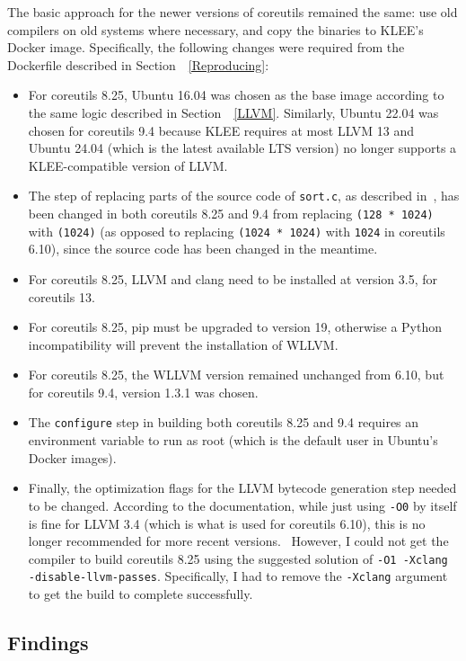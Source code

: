 \documentclass{article}
\let\savedCite=\cite
\renewcommand{\cite}{\unskip~\savedCite}
\let\savedRef=\ref
\renewcommand{\ref}{\unskip~\savedRef}
\begin{document}
The basic approach for the newer versions of coreutils remained the same: use old compilers on old systems where necessary, and copy the binaries to KLEE's Docker image. Specifically, the following changes were required from the Dockerfile described in Section~\ref{Reproducing}:
\begin{itemize}
    \item For coreutils 8.25, Ubuntu 16.04 was chosen as the base image according to the same logic described in Section~\ref{LLVM}. Similarly, Ubuntu 22.04 was chosen for coreutils 9.4 because KLEE requires at most LLVM 13 and Ubuntu 24.04 (which is the latest available LTS version) no longer supports a KLEE-compatible version of LLVM.
    \item The step of replacing parts of the source code of \lstinline{sort.c}, as described in\cite{KLEEFAQ}, has been changed in both coreutils 8.25 and 9.4 from replacing \lstinline{(128 * 1024)} with \lstinline{(1024)} (as opposed to replacing \lstinline{(1024 * 1024)} with \lstinline{1024} in coreutils 6.10), since the source code has been changed in the meantime.
    \item For coreutils 8.25, LLVM and clang need to be installed at version 3.5, for coreutils 13.
    \item For coreutils 8.25, pip must be upgraded to version 19, otherwise a Python incompatibility will prevent the installation of WLLVM.
    \item For coreutils 8.25, the WLLVM version remained unchanged from 6.10, but for coreutils 9.4, version 1.3.1 was chosen.
    \item The \lstinline{configure} step in building both coreutils 8.25 and 9.4 requires an environment variable to run as root (which is the default user in Ubuntu's Docker images).
    \item Finally, the optimization flags for the LLVM bytecode generation step needed to be changed. According to the documentation, while just using \lstinline{-O0} by itself is fine for LLVM 3.4 (which is what is used for coreutils 6.10), this is no longer recommended for more recent versions.\cite{KLEETutorial, KLEEIssue} However, I could not get the compiler to build coreutils 8.25 using the suggested solution of \lstinline{-O1 -Xclang -disable-llvm-passes}. Specifically, I had to remove the \lstinline{-Xclang} argument to get the build to complete successfully.
\end{itemize}

\subsection{Findings}
\end{document}
